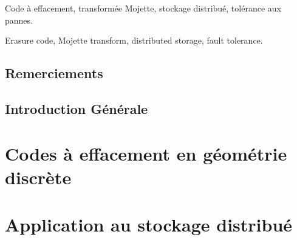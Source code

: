 \begin{motscles}
    Code à effacement, transformée Mojette, stockage distribué,
    tolérance aux pannes.
\end{motscles}

\begin{abstract}
    \footnotesize
    
\end{abstract}

\begin{keywords}
    Erasure code, Mojette transform, distributed storage, fault tolerance.
\end{keywords}

\maketitle

\chapter*{Remerciements}

\lipsum[1-2]

\newpage

\dominitoc
\tableofcontents

\chapter*{Introduction Générale}




\part{Codes à effacement en géométrie discrète}











\part{Application au stockage distribué}



